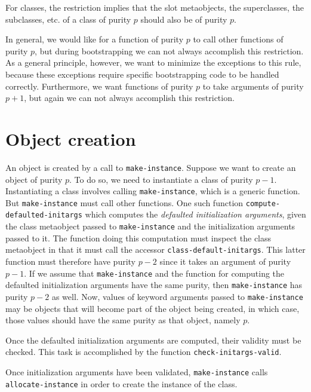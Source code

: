 For classes, the restriction implies that the slot metaobjects, the
superclasses, the subclasses, etc. of a class of purity $p$ should
also be of purity $p$.

In general, we would like for a function of purity $p$ to call other
functions of purity $p$, but during bootstrapping we can not always
accomplish this restriction.  As a general principle, however, we want
to minimize the exceptions to this rule, because these exceptions
require specific bootstrapping code to be handled correctly.
Furthermore, we want functions of purity $p$ to take arguments of
purity $p+1$, but again we can not always accomplish this
restriction.

\section{Object creation}
\label{sec-app-bootstrapping-object-allocation}

An object is created by a call to \texttt{make-instance}.
Suppose we want to create an object of purity $p$.  To do so, we
need to instantiate a class of purity $p-1$.  Instantiating a class
involves calling \texttt{make-instance}, which is a generic
function.  But \texttt{make-instance} must call other functions.  One
such function \texttt{compute-defaulted-initargs} which
computes the \emph{defaulted initialization arguments},
given the class metaobject passed to \texttt{make-instance} and the
initialization arguments passed to it.  The function doing this
computation must inspect the class metaobject in that it must call the
accessor \texttt{class-default-initargs}.  This latter function must
therefore have purity $p-2$ since it takes an argument of purity
$p-1$.  If we assume that \texttt{make-instance} and the function for
computing the defaulted initialization arguments have the same purity,
then \texttt{make-instance} has purity $p-2$ as well.  Now, values of
keyword arguments passed to \texttt{make-instance} may be objects that
will become part of the object being created, in which case, those
values should have the same purity as that object, namely $p$.

Once the defaulted initialization arguments are computed, their
validity must be checked.  This task is accomplished by the function
\texttt{check-initargs-valid}.

Once initialization arguments have been validated,
\texttt{make-instance} calls \texttt{allocate-instance} in order to
create the instance of the class.

